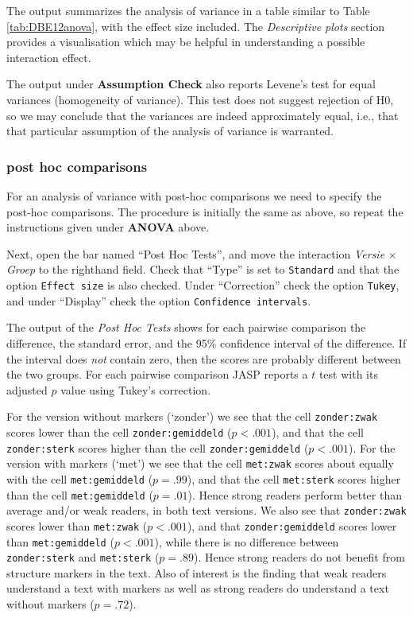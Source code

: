 \documentclass[
]{book}
\begin{document}
The output summarizes the analysis of variance in a table similar to Table \ref{tab:DBE12anova}, with the effect size included.
The \emph{Descriptive plots} section provides a visualisation which may be helpful in understanding a possible interaction effect.

The output under \textbf{Assumption Check} also reports Levene's test for equal variances (homogeneity of variance). This test does not suggest rejection of H0, so we may conclude that the variances are indeed approximately equal, i.e., that that particular assumption of the analysis of variance is warranted.

\subsubsection{post hoc comparisons}\label{post-hoc-comparisons-1}

For an analysis of variance with post-hoc comparisons we need to specify the post-hoc comparisons. The procedure is initially the same as above, so repeat the instructions given under \textbf{ANOVA} above.

Next, open the bar named ``Post Hoc Tests'', and move the interaction \emph{Versie} \(\times\) \emph{Groep} to the righthand field.
Check that ``Type'' is set to \texttt{Standard} and that the option \texttt{Effect\ size} is also checked.
Under ``Correction'' check the option \texttt{Tukey}, and under ``Display'' check the option \texttt{Confidence\ intervals}.

The output of the \emph{Post Hoc Tests} shows for each pairwise comparison the difference, the standard error, and the 95\% confidence interval of the difference. If the interval does \emph{not} contain zero, then the scores are probably different between the two groups. For each pairwise comparison JASP reports a \(t\) test with its adjusted \(p\) value using Tukey's correction.

For the version without markers (`zonder') we see that the cell \texttt{zonder:zwak} scores lower than the cell \texttt{zonder:gemiddeld} (\(p<.001\)), and that the cell \texttt{zonder:sterk} scores higher than the cell \texttt{zonder:gemiddeld} (\(p<.001\)).
For the version with markers (`met') we see that the cell \texttt{met:zwak} scores about equally with the cell \texttt{met:gemiddeld} (\(p=.99\)), and that the cell \texttt{met:sterk} scores higher than the cell \texttt{met:gemiddeld} (\(p=.01\)). Hence strong readers perform better than average and/or weak readers, in both text versions.
We also see that \texttt{zonder:zwak} scores lower than \texttt{met:zwak} (\(p<.001\)),
and that \texttt{zonder:gemiddeld} scores lower than \texttt{met:gemiddeld} (\(p<.001\)),
while there is no difference between \texttt{zonder:sterk} and \texttt{met:sterk} (\(p=.89\)).
Hence strong readers do not benefit from structure markers in the text.
Also of interest is the finding that weak readers understand a text with markers as well as strong readers do understand a text without markers (\(p=.72\)).
\end{document}
